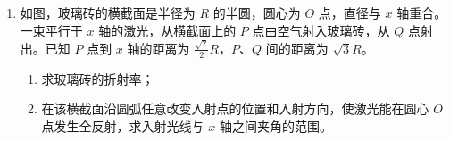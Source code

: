 \documentclass[\gkver]{gaokaozhenti}
\begin{document}
\begin{enumerate}
{（2）用该欧姆表对阻值为 $150 \UO$ 的标准电阻进行试测，为减小测量误差，应选用欧姆表的 $\times 10$ 挡；

进行欧姆调零后，将电阻接在两表笔间，指针指向图乙中的虚线位置，则该电阻的测量值为 $16 \times 10 \UO = 160 \UO$

（3）根据闭合电路欧姆定律 $E = I_{1}(r + R_{g} + R_{\text{阻}})$，$E = I_{2}(r + R_{g} + R_{\text{阻}}')$

代入数据 $I_{1} = 10 \UmA$，$I_{2} = 20 \UmA$

联立可得 $r = 7 \UO$，$E = 2.8 \UV$
}

\item
如图，玻璃砖的横截面是半径为 $R$ 的半圆，圆心为 $O$ 点，直径与 $x$ 轴重合。一束平行于 $x$ 轴的激光，从横截面上的 $P$ 点由空气射入玻璃砖，从 $Q$ 点射出。已知 $P$ 点到 $x$ 轴的距离为 $\frac{\sqrt{2}}{2}R$，$P$、$Q$ 间的距离为 $\sqrt{3}R$。
\begin{enumerate}
\item
求玻璃砖的折射率；
\item
在该横截面沿圆弧任意改变入射点的位置和入射方向，使激光能在圆心 $O$ 点发生全反射，求入射光线与 $x$ 轴之间夹角的范围。
\end{enumerate}

\onepicture[align=right, w=4.82cm]{}

\jdanswer{
\begin{enumerate}
\item
$\sqrt{2}$

\item
$(0, 45^{\circ}]$ 或 $[135^{\circ}, 180^{\circ})$
\end{enumerate}
}
\end{enumerate}
\end{document}

